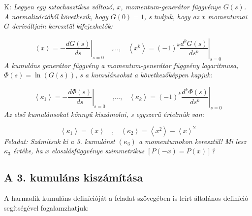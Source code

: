 \section{} \label{sec:3}
K: \textit{Legyen egy sztochasztikus változó, $x$, momentum-generátor függvénye $G \left( s \right)$. A normalizációból következik, hogy $G  \left( 0 \right) = 1$, s tudjuk, hogy az $x$ momentumai $G$ deriváltjain keresztül kifejezhetők:}

\begin{equation*}
    \left< x \right>
    =
    - \left. \frac{d G \left( s \right)}{d s} \right\rvert_{s = 0}
    \quad \text{,} \dots \text{,} \quad
    \left< x^{k} \right>
    =
    \left( -1 \right)^{k} \left. \frac{d^{k} G \left( s \right)}{d s^{k}} \right\rvert_{s = 0}
\end{equation*}
\textit{A kumuláns generátor függvény a momentum-generátor függvény logaritmusa, $\Phi \left( s \right) = \ln \left( G \left( s \right) \right)$, s a kumulánsokat a következőképpen kapjuk:}

\begin{equation*}
    \left< \kappa_{1} \right>
    =
    - \left. \frac{d \Phi \left( s \right)}{d s} \right\rvert_{s = 0}
    \quad \text{,} \dots \text{,} \quad
    \left< \kappa_{k} \right>
    =
    \left( -1 \right)^{k} \left. \frac{d^{k} \Phi \left( s \right)}{d s^{k}} \right\rvert_{s = 0}
\end{equation*}
\textit{Az első kumulánsokat könnyű kiszámolni, s egyszerű értelmük van:}

\begin{equation*}
    \left< \kappa_{1} \right>
    =
    \left< x \right>
    \quad \text{,} \quad
    \left< \kappa_{2} \right>
    =
    \left< x^{2} \right> - \left< x \right>^{2}
\end{equation*}
\textit{Feladat: Számítsuk ki a 3. kumulánst $\left( \kappa_{3} \right)$ a momentumokon keresztül! Mi lesz $\kappa_{3}$ értéke, ha $x$ eloszlásfüggvénye szimmetrikus $\left[ P \left( -x \right) = P \left( x \right) \right]$?}

\subsection{A 3. kumuláns kiszámítása}

A harmadik kumuláns definícióját a feladat szövegében is leírt általános definíció segítségével fogalamzhatjuk:

